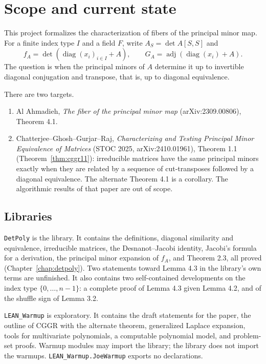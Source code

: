 \chapter{Scope and current state}

This project formalizes the characterization of fibers of the principal minor map.
For a finite index type $I$ and a field $F$, write $A_S=\det A[S,S]$ and
\[ f_A=\det(\operatorname{diag}(x_i)_{i\in I}+A),\qquad
   G_A=\operatorname{adj}(\operatorname{diag}(x_i)+A). \]
The question is when the principal minors of $A$ determine it up to invertible diagonal
conjugation and transpose, that is, up to diagonal equivalence.

There are two targets.
\begin{enumerate}
\item Al Ahmadieh, \emph{The fiber of the principal minor map} (arXiv:2309.00806),
Theorem 4.1.
\item Chatterjee--Ghosh--Gurjar--Raj, \emph{Characterizing and Testing Principal Minor
Equivalence of Matrices} (STOC 2025, arXiv:2410.01961), Theorem 1.1
(Theorem~\ref{thm:cggr11}): irreducible matrices have the same principal minors exactly
when they are related by a sequence of cut-transposes followed by a diagonal equivalence.
The alternate Theorem 4.1 is a corollary. The algorithmic results of that paper are out of
scope.
\end{enumerate}

\section{Libraries}

\texttt{DetPoly} is the library. It contains the definitions, diagonal similarity and
equivalence, irreducible matrices, the Desnanot--Jacobi identity, Jacobi's formula for a
derivation, the principal minor expansion of $f_A$, and Theorem 2.3, all proved
(Chapter~\ref{chap:detpoly}). Two statements toward
Lemma 4.3 in the library's own terms are unfinished. It also contains two self-contained
developments on the index type $\{0,\dots,n-1\}$: a complete proof of Lemma 4.3 given
Lemma 4.2, and of the shuffle sign of Lemma 3.2.

\texttt{LEAN\_Warmup} is exploratory. It contains the draft statements for the paper,
the outline of CGGR with the alternate theorem, generalized Laplace expansion, tools for
multivariate polynomials, a computable polynomial model, and problem-set proofs.
Warmup modules may import the library; the library does not import the warmups.
\texttt{LEAN\_Warmup.JoeWarmup} exports no declarations.

